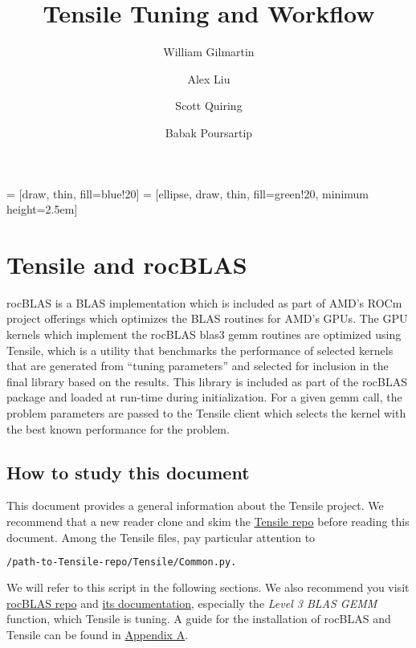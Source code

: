 \documentclass[]{article}
\title{Tensile Tuning and Workflow}
\author{William Gilmartin \and Alex Liu \and Scott Quiring \and Babak Poursartip}
\begin{document}
\maketitle

\newpage

\tableofcontents



 = [draw, thin, fill=blue!20]
 = [ellipse, draw, thin, fill=green!20, minimum height=2.5em]

\newpage

\section{Tensile and rocBLAS}


rocBLAS is a BLAS implementation which is included as part of AMD's ROCm project offerings which optimizes the BLAS routines for AMD's GPUs. The GPU kernels which implement the rocBLAS blas3 gemm routines are optimized using Tensile, which is a utility that benchmarks the performance of selected kernels that are generated from ``tuning parameters'' and selected for inclusion in the final library based on the results. This library is included as part of the rocBLAS package and loaded at run-time during initialization. For a given gemm call, the problem parameters are passed to the Tensile client which selects the kernel with the best known performance for the problem.


\subsection{How to study this document}
This document provides a general information about the Tensile project. We recommend that a new reader clone and skim the \href{https://github.com/ROCmSoftwarePlatform/Tensile}{Tensile repo} before reading this document. Among the Tensile files, pay particular attention to 

\begin{lstlisting}[language=bash,breaklines=true]
/path-to-Tensile-repo/Tensile/Common.py.
\end{lstlisting}

We will refer to this script in the following sections. We also recommend you visit \href{https://github.com/ROCmSoftwarePlatform/rocBLAS}{rocBLAS repo} and \href{https://rocBLAS.readthedocs.io/en/rocm-4.5.0/}{its documentation}, especially the \textit{Level 3 BLAS GEMM} function, which Tensile is tuning. A guide for the installation of rocBLAS and Tensile can be found in \hyperref[sec:appendixA]{Appendix A}.
\end{document}
